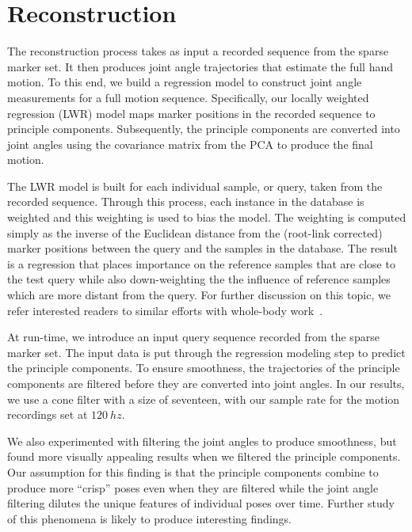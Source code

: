 
\section{Reconstruction}

The reconstruction process takes as input a recorded sequence from the sparse marker set.  It then produces joint angle trajectories that estimate the full hand motion.  
To this end, we build a regression model to construct joint angle measurements for a full motion sequence. Specifically, our locally weighted regression (LWR) model maps marker positions in the recorded sequence to principle components. Subsequently, the principle components are converted into joint angles using the covariance matrix from the PCA to produce the final motion.

The LWR model is built for each individual sample, or query, taken from the
recorded sequence.  Through this process,
each instance in the database is weighted and this weighting is used
to bias the model.  The weighting is computed simply as the inverse
of the Euclidean distance from the (root-link corrected) marker positions 
between the query and the samples in the database.  The result
is a regression that places importance on the reference samples
that are close to the test query while also down-weighting the
the influence of reference samples which are more distant
from the query.  For further discussion on this topic, we
refer interested readers to similar efforts with whole-body work~\cite{}.

At run-time, we introduce an input query sequence
recorded from the sparse marker set. The input data is 
put through the regression modeling step to predict the principle components.
To ensure smoothness, the trajectories of the principle components
are filtered before they are converted into joint angles.  In our results, 
we use a cone filter with a size of seventeen, with our sample rate for
the motion recordings set at $120~hz$.  

We also experimented with
filtering the joint angles to produce smoothness, but found more visually 
appealing results when we filtered the principle components.  Our 
assumption for this finding is that the principle components combine
to produce more ``crisp'' poses even when they are filtered while
the joint angle filtering dilutes the unique features of individual
poses over time.  Further study of this phenomena is likely to 
produce interesting findings.







